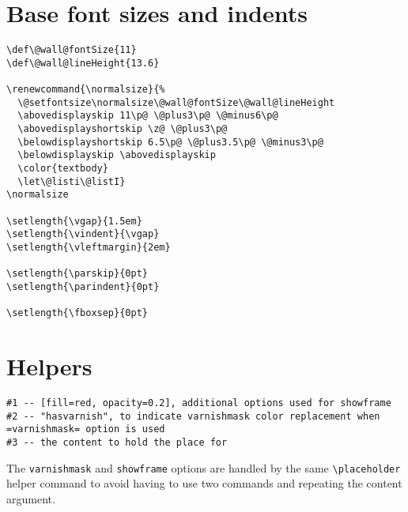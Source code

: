 \documentclass[11pt,oneside]{memoir-article}
\begin{document}
\section{Base font sizes and indents}
\label{sec:org09f8d15}

\begin{verbatim}
\def\@wall@fontSize{11}
\def\@wall@lineHeight{13.6}

\renewcommand{\normalsize}{%
  \@setfontsize\normalsize\@wall@fontSize\@wall@lineHeight
  \abovedisplayskip 11\p@ \@plus3\p@ \@minus6\p@
  \abovedisplayshortskip \z@ \@plus3\p@
  \belowdisplayshortskip 6.5\p@ \@plus3.5\p@ \@minus3\p@
  \belowdisplayskip \abovedisplayskip
  \color{textbody}
  \let\@listi\@listI}
\normalsize

\setlength{\vgap}{1.5em}
\setlength{\vindent}{\vgap}
\setlength{\vleftmargin}{2em}

\setlength{\parskip}{0pt}
\setlength{\parindent}{0pt}

\setlength{\fboxsep}{0pt}
\end{verbatim}

\section{Helpers}
\label{sec:org846f73e}

\begin{verbatim}
#1 -- [fill=red, opacity=0.2], additional options used for showframe
#2 -- "hasvarnish", to indicate varnishmask color replacement when =varnishmask= option is used
#3 -- the content to hold the place for
\end{verbatim}


The \texttt{varnishmask} and \texttt{showframe} options are handled by the same \texttt{\textbackslash{}placeholder}
helper command to avoid having to use two commands and repeating the content
argument.
\end{document}

